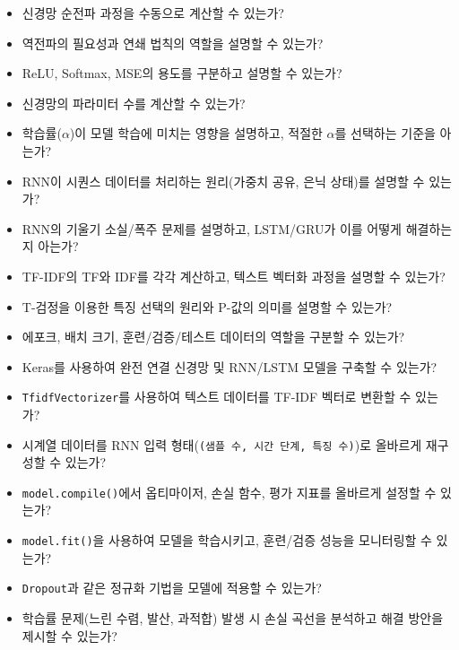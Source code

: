 \documentclass[11pt,a4paper]{article}
\theoremstyle{definition}
\begin{document}
\begin{tcolorbox}[title=\textbf{학습 및 이해도 점검}]
\begin{itemize}
    \item 신경망 순전파 과정을 수동으로 계산할 수 있는가?
    \item 역전파의 필요성과 연쇄 법칙의 역할을 설명할 수 있는가?
    \item ReLU, Softmax, MSE의 용도를 구분하고 설명할 수 있는가?
    \item 신경망의 파라미터 수를 계산할 수 있는가?
    \item 학습률($\alpha$)이 모델 학습에 미치는 영향을 설명하고, 적절한 $\alpha$를 선택하는 기준을 아는가?
    \item RNN이 시퀀스 데이터를 처리하는 원리(가중치 공유, 은닉 상태)를 설명할 수 있는가?
    \item RNN의 기울기 소실/폭주 문제를 설명하고, LSTM/GRU가 이를 어떻게 해결하는지 아는가?
    \item TF-IDF의 TF와 IDF를 각각 계산하고, 텍스트 벡터화 과정을 설명할 수 있는가?
    \item T-검정을 이용한 특징 선택의 원리와 P-값의 의미를 설명할 수 있는가?
    \item 에포크, 배치 크기, 훈련/검증/테스트 데이터의 역할을 구분할 수 있는가?
\end{itemize}
\end{tcolorbox}

\begin{tcolorbox}[title=\textbf{실습 및 코드 구현 점검}]
\begin{itemize}
    \item Keras를 사용하여 완전 연결 신경망 및 RNN/LSTM 모델을 구축할 수 있는가?
    \item \texttt{TfidfVectorizer}를 사용하여 텍스트 데이터를 TF-IDF 벡터로 변환할 수 있는가?
    \item 시계열 데이터를 RNN 입력 형태(\texttt{(샘플 수, 시간 단계, 특징 수)})로 올바르게 재구성할 수 있는가?
    \item \texttt{model.compile()}에서 옵티마이저, 손실 함수, 평가 지표를 올바르게 설정할 수 있는가?
    \item \texttt{model.fit()}을 사용하여 모델을 학습시키고, 훈련/검증 성능을 모니터링할 수 있는가?
    \item \texttt{Dropout}과 같은 정규화 기법을 모델에 적용할 수 있는가?
    \item 학습률 문제(느린 수렴, 발산, 과적합) 발생 시 손실 곡선을 분석하고 해결 방안을 제시할 수 있는가?
\end{itemize}
\end{tcolorbox}
\end{document}
